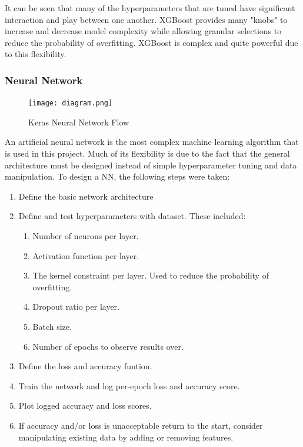 \documentclass[11pt]{article}
\begin{document}
	It can be seen that many of the hyperparameters that are tuned have significant interaction and play between one another. XGBoost provides many "knobs" to increase and decrease model complexity while allowing granular selections to reduce the probability of overfitting. XGBoost is complex and quite powerful due to this flexibility.
	
	\subsubsection{Neural Network}
	
	\begin{figure}
		\begin{center}
			\texttt{[image: diagram.png]}
		\end{center}
		\caption{Keras Neural Network Flow}
	\end{figure}

    An artificial neural network is the most complex machine learning algorithm that is used in this project. Much of its flexibility is due to the fact that the general architecture must be designed instead of simple hyperparameter tuning and data manipulation. To design a NN, the following steps were taken:
	
	\begin{enumerate}
		\item Define the basic network architecture
		\item Define and test hyperparameters with dataset. These included:
			\begin{enumerate}
				\item Number of neurons per layer.
				\item Activation function per layer.
				\item The kernel constraint per layer. Used to reduce the probability of overfitting.
				\item Dropout ratio per layer. 
				\item Batch size.
				\item Number of epochs to observe results over.
			\end{enumerate}
		\item Define the loss and accuracy funtion.
		\item Train the network and log per-epoch loss and accuracy score.
		\item Plot logged accuracy and loss scores.
		\item If accuracy and/or loss is unacceptable return to the start, consider manipulating existing data by adding or removing features.
	\end{enumerate}
		
\end{document}
